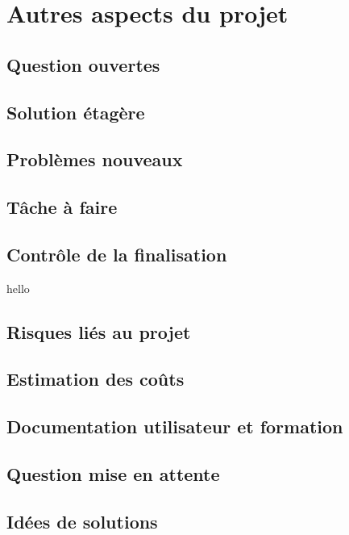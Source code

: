 	\section{Autres aspects du projet}
		\subsection{Question ouvertes}
		
		\subsection{Solution étagère}
		
		\subsection{Problèmes nouveaux}
		
		\subsection{Tâche à faire}
		
		\subsection{Contrôle de la finalisation}
			hello
		\subsection{Risques liés au projet}
		
		\subsection{Estimation des coûts}
		
		\subsection{Documentation utilisateur et formation}
		
		\subsection{Question mise en attente}
		
		\subsection{Idées de solutions}
		


